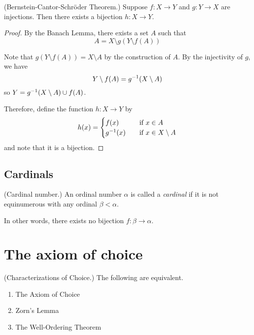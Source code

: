 \documentclass[11pt]{article}
\begin{document}
\begin{prop}{(Bernstein-Cantor-Schr\"oder Theorem.)}
    Suppose $f : X \to Y$ and $g : Y \to X$ are injections.
    Then there exists a bijection $h : X \to Y$.
\end{prop}

\begin{proof}
    By the Banach Lemma, there exists a set $A$ such that
    \begin{equation*}
        A = X \setminus g(Y \setminus f(A))
    \end{equation*}

    Note that $g(Y \setminus f(A)) = X \setminus A$ by the construction of $A$.
    By the injectivity of $g$, we have
    \begin{equation*}
        Y \setminus f(A) = g^{-1}(X \setminus A)
    \end{equation*}
    so $Y = g^{-1}(X \setminus A) \cup f(A)$.

    Therefore, define the function $h : X \to Y$ by
    \begin{equation*}
        h(x) = \begin{cases}
            f(x) &\quad\text{if } x \in A \\
            g^{-1}(x) &\quad\text{if } x \in X \setminus A
        \end{cases}
    \end{equation*}
    and note that it is a bijection.
\end{proof}

\subsection{Cardinals}

\begin{defn}{(Cardinal number.)}
    An ordinal number $\alpha$ is called a \emph{cardinal} if it is not
    equinumerous with any ordinal $\beta < \alpha$.

    In other words, there exists no bijection $f : \beta \to \alpha$.
\end{defn}

\section{The axiom of choice}

\begin{prop}{(Characterizations of Choice.)}
    The following are equivalent.
    \begin{enumerate}
        \item
            The Axiom of Choice
        \item
            Zorn's Lemma
        \item
            The Well-Ordering Theorem
    \end{enumerate}
\end{prop}
\end{document}
